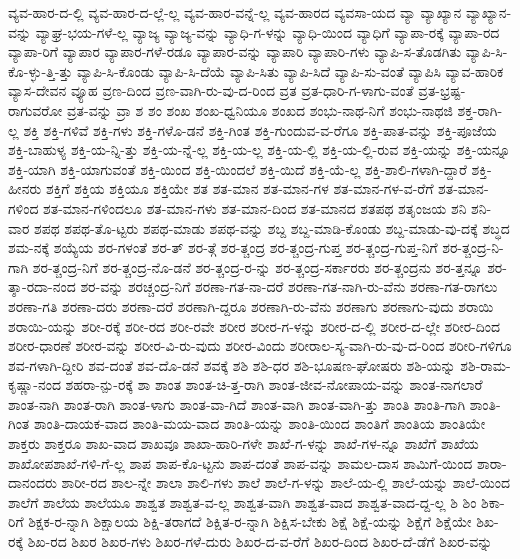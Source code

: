 {ವ್ಯವ-ಹಾರ-ದ-ಲ್ಲಿ
ವ್ಯವ-ಹಾರ-ದ-ಲ್ಲೆ-ಲ್ಲ
ವ್ಯವ-ಹಾರ-ವನ್ನೆ-ಲ್ಲ
ವ್ಯವ-ಹಾರದ
ವ್ಯವಸಾ-ಯದ
ವ್ಯಾ
ವ್ಯಾಖ್ಯಾನ
ವ್ಯಾಖ್ಯಾನ-ವನ್ನು
ವ್ಯಾಘ್ರ-ಭಯ-ಗಳೆ-ಲ್ಲ
ವ್ಯಾಜ್ಯ
ವ್ಯಾಜ್ಯ-ವನ್ನು
ವ್ಯಾಧಿ-ಗ-ಳನ್ನು
ವ್ಯಾಧಿ-ಯಿಂದ
ವ್ಯಾಧಿಗೆ
ವ್ಯಾಪಾ-ರಕ್ಕೆ
ವ್ಯಾಪಾ-ರದ
ವ್ಯಾಪಾ-ರಿಗೆ
ವ್ಯಾಪಾರ
ವ್ಯಾಪಾರ-ಗಳೆ-ರಡೂ
ವ್ಯಾಪಾರ-ವನ್ನು
ವ್ಯಾಪಾರಿ
ವ್ಯಾಪಾರಿ-ಗಳು
ವ್ಯಾಪಿ-ಸ-ತೊಡಗಿತು
ವ್ಯಾಪಿ-ಸಿ-ಕೊ-ಳ್ಳು-ತ್ತಿ-ತ್ತು
ವ್ಯಾಪಿ-ಸಿ-ಕೊಂಡು
ವ್ಯಾಪಿ-ಸಿ-ದೆಯೆ
ವ್ಯಾಪಿ-ಸಿತು
ವ್ಯಾಪಿ-ಸಿದೆ
ವ್ಯಾಪಿ-ಸು-ವಂತೆ
ವ್ಯಾಪಿಸಿ
ವ್ಯಾವ-ಹಾರಿಕ
ವ್ಯಾಸ-ದೇವನ
ವ್ಯೂಹ
ವ್ರಣ-ದಿಂದ
ವ್ರಣ-ವಾಗಿ-ರು-ವು-ದ-ರಿಂದ
ವ್ರತ
ವ್ರತ-ಧಾರಿ-ಗ-ಳಾಗು-ವಂತೆ
ವ್ರತ-ಭ್ರಷ್ಟ-ರಾಗುವರೋ
ವ್ರತ-ವನ್ನು
ವ್ರಾ
ಶ
ಶಂ
ಶಂಖ
ಶಂಖ-ಧ್ವನಿಯೂ
ಶಂಖದ
ಶಂಭು-ನಾಥ-ನಿಗೆ
ಶಂಭು-ನಾಥಜಿ
ಶಕ್ತ-ರಾಗಿ-ಲ್ಲ
ಶಕ್ತಿ
ಶಕ್ತಿ-ಗಳಿವೆ
ಶಕ್ತಿ-ಗಳು
ಶಕ್ತಿ-ಗಳೊ-ಡನೆ
ಶಕ್ತಿ-ಗಿಂತ
ಶಕ್ತಿ-ಗುಂದುವ-ವ-ರೆಗೂ
ಶಕ್ತಿ-ಪಾತ-ವನ್ನು
ಶಕ್ತಿ-ಪೂಜೆಯ
ಶಕ್ತಿ-ಬಾಹುಳ್ಯ
ಶಕ್ತಿ-ಯ-ನ್ನಿ-ತ್ತು
ಶಕ್ತಿ-ಯ-ನ್ನೆ-ಲ್ಲ
ಶಕ್ತಿ-ಯ-ಲ್ಲ
ಶಕ್ತಿ-ಯ-ಲ್ಲಿ
ಶಕ್ತಿ-ಯ-ಲ್ಲಿ-ರುವ
ಶಕ್ತಿ-ಯನ್ನು
ಶಕ್ತಿ-ಯನ್ನೂ
ಶಕ್ತಿ-ಯಾಗಿ
ಶಕ್ತಿ-ಯಾಗುವಂತೆ
ಶಕ್ತಿ-ಯಿಂದ
ಶಕ್ತಿ-ಯಿಂದಲೆ
ಶಕ್ತಿ-ಯಿದೆ
ಶಕ್ತಿ-ಯೆ-ಲ್ಲ
ಶಕ್ತಿ-ಶಾಲಿ-ಗಳಾಗಿ-ದ್ದಾರೆ
ಶಕ್ತಿ-ಹೀನರು
ಶಕ್ತಿಗೆ
ಶಕ್ತಿಯ
ಶಕ್ತಿಯೂ
ಶಕ್ತಿಯೇ
ಶತ
ಶತ-ಮಾನ
ಶತ-ಮಾನ-ಗಳ
ಶತ-ಮಾನ-ಗಳ-ವ-ರೆಗೆ
ಶತ-ಮಾನ-ಗಳಿಂದ
ಶತ-ಮಾನ-ಗಳಿಂದಲೂ
ಶತ-ಮಾನ-ಗಳು
ಶತ-ಮಾನ-ದಿಂದ
ಶತ-ಮಾನದ
ಶತಪಥ
ಶತೃಂಜಯ
ಶನಿ
ಶನಿ-ವಾರ
ಶಪಥ
ಶಪಥ-ತೊ-ಟ್ಟರು
ಶಪಥ-ಮಾಡು
ಶಪಥ-ವನ್ನು
ಶಬ್ದ
ಶಬ್ದ-ಮಾಡಿ-ಕೊಂಡು
ಶಬ್ದ-ಮಾಡು-ವು-ದಕ್ಕೆ
ಶಬ್ಧದ
ಶಮ-ನಕ್ಕೆ
ಶಯ್ಯೆಯ
ಶರ-ಗಳಂತೆ
ಶರ-ತ್
ಶರ-ತ್ಗೆ
ಶರ-ತ್ಚಂದ್ರ
ಶರ-ತ್ಚಂದ್ರ-ಗುಪ್ತ
ಶರ-ತ್ಚಂದ್ರ-ಗುಪ್ತ-ನಿಗೆ
ಶರ-ತ್ಚಂದ್ರ-ನಿ-ಗಾಗಿ
ಶರ-ತ್ಚಂದ್ರ-ನಿಗೆ
ಶರ-ತ್ಚಂದ್ರ-ನೊ-ಡನೆ
ಶರ-ತ್ಚಂದ್ರ-ರ-ನ್ನು
ಶರ-ತ್ಚಂದ್ರ-ಸರ್ಕಾರರು
ಶರ-ತ್ಚಂದ್ರನು
ಶರ-ತ್ತನ್ನೂ
ಶರ-ತ್ಶಾ-ರದಾ-ನಂದ
ಶರ-ವನ್ನು
ಶರಚ್ಚಂದ್ರ-ನಿಗೆ
ಶರಣಾ-ಗತ-ನಾ-ದರೆ
ಶರಣಾ-ಗತ-ನಾಗಿ-ರು-ವೆನು
ಶರಣಾ-ಗತ-ರಾಗಲು
ಶರಣಾ-ಗತಿ
ಶರಣಾ-ದರು
ಶರಣಾ-ದರೆ
ಶರಣಾಗಿ-ದ್ದರೂ
ಶರಣಾಗಿ-ರು-ವೆನು
ಶರಣಾಗು
ಶರಣಾಗು-ವುದು
ಶರಾಯಿ
ಶರಾಯಿ-ಯನ್ನು
ಶರೀ-ರಕ್ಕೆ
ಶರೀ-ರದ
ಶರೀ-ರವೇ
ಶರೀರ
ಶರೀರ-ಗ-ಳನ್ನು
ಶರೀರ-ದ-ಲ್ಲಿ
ಶರೀರ-ದ-ಲ್ಲೇ
ಶರೀರ-ದಿಂದ
ಶರೀರ-ಧಾರಣೆ
ಶರೀರ-ವನ್ನು
ಶರೀರ-ವಿ-ರು-ವುದು
ಶರೀರ-ವಿಂದು
ಶರೀರಾಲ-ಸ್ಯ-ವಾಗಿ-ರು-ವು-ದ-ರಿಂದ
ಶರೀರಿ-ಗಳಿಗೂ
ಶವ-ಗಳಾಗಿ-ದ್ದೀರಿ
ಶವ-ದಂತೆ
ಶವ-ದೊ-ಡನೆ
ಶವಕ್ಕೆ
ಶಶಿ
ಶಶಿ-ಧರ
ಶಶಿ-ಭೂಷಣ-ಘೋಷರು
ಶಶಿ-ಯನ್ನು
ಶಶಿ-ರಾಮ-ಕೃಷ್ಣಾ-ನಂದ
ಶಹರಾ-ನ್ಪು-ರಕ್ಕೆ
ಶಾ
ಶಾಂತ
ಶಾಂತ-ಚಿ-ತ್ತ-ರಾಗಿ
ಶಾಂತ-ಜೀವ-ನೋಪಾಯ-ವನ್ನು
ಶಾಂತ-ನಾಗಲಾರೆ
ಶಾಂತ-ನಾಗಿ
ಶಾಂತ-ರಾಗಿ
ಶಾಂತ-ಳಾಗು
ಶಾಂತ-ವಾ-ಗಿದೆ
ಶಾಂತ-ವಾಗಿ
ಶಾಂತ-ವಾಗಿ-ತ್ತು
ಶಾಂತಿ
ಶಾಂತಿ-ಗಾಗಿ
ಶಾಂತಿ-ಗಿಂತ
ಶಾಂತಿ-ದಾಯಕ-ವಾದ
ಶಾಂತಿ-ಮಯ-ವಾದ
ಶಾಂತಿ-ಯನ್ನು
ಶಾಂತಿ-ಯಿಂದ
ಶಾಂತಿಗೆ
ಶಾಂತಿಯ
ಶಾಂತಿಯೇ
ಶಾಕ್ತರು
ಶಾಕ್ತರೂ
ಶಾಖ-ವಾದ
ಶಾಖವೂ
ಶಾಖಾ-ಹಾರಿ-ಗಳೇ
ಶಾಖೆ-ಗ-ಳನ್ನು
ಶಾಖೆ-ಗಳ-ನ್ನೂ
ಶಾಖೆಗೆ
ಶಾಖೆಯ
ಶಾಖೋಪಶಾಖೆ-ಗಳಿ-ಗೆ-ಲ್ಲ
ಶಾಪ
ಶಾಪ-ಕೊ-ಟ್ಟನು
ಶಾಪ-ದಂತೆ
ಶಾಪ-ವನ್ನು
ಶಾಮಲ-ದಾಸ
ಶಾಮಿಗೆ-ಯಿಂದ
ಶಾರಾ-ದಾನಂದರು
ಶಾರೀ-ರದ
ಶಾಲ-ನ್ನೇ
ಶಾಲಾ
ಶಾಲಿ-ಗಳು
ಶಾಲೆ
ಶಾಲೆ-ಗ-ಳನ್ನು
ಶಾಲೆ-ಯ-ಲ್ಲಿ
ಶಾಲೆ-ಯನ್ನು
ಶಾಲೆ-ಯಿಂದ
ಶಾಲೆಗೆ
ಶಾಲೆಯ
ಶಾಲೆಯೂ
ಶಾಶ್ವತ
ಶಾಶ್ವತ-ವ-ಲ್ಲ
ಶಾಶ್ವತ-ವಾಗಿ
ಶಾಶ್ವತ-ವಾದ
ಶಾಶ್ವತ-ವಾದ-ದ್ದ-ಲ್ಲ
ಶಿ
ಶಿಂ
ಶಿಕಾ-ರಿಗೆ
ಶಿಕ್ಷಕ-ರ-ನ್ನಾಗಿ
ಶಿಕ್ಷಾಲಯ
ಶಿಕ್ಷಿ-ತರಾಗದೆ
ಶಿಕ್ಷಿತ-ರ-ನ್ನಾಗಿ
ಶಿಕ್ಷಿಸ-ಬೇಕು
ಶಿಕ್ಷೆ
ಶಿಕ್ಷೆ-ಯನ್ನು
ಶಿಕ್ಷೆಗೆ
ಶಿಕ್ಷೆಯೇ
ಶಿಖ-ರಕ್ಕೆ
ಶಿಖ-ರದ
ಶಿಖರ
ಶಿಖರ-ಗಳು
ಶಿಖರ-ಗಳೆ-ದುರು
ಶಿಖರ-ದ-ವ-ರೆಗೆ
ಶಿಖರ-ದಿಂದ
ಶಿಖರ-ದೆ-ಡೆಗೆ
ಶಿಖರ-ವನ್ನು
}
